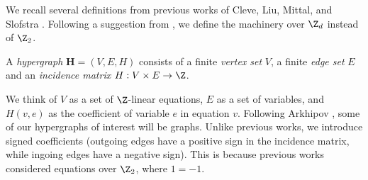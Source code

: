 We recall several definitions from previous works of Cleve, Liu, Mittal, and Slofstra \cite{slofstra2016tsirelson,cleve2016perfect,cleve2014characterization}. Following a suggestion from \cite{cleve2016perfect}, we define the machinery over $\Z_d$ instead of $\Z_2$. %


\begin{definition}
	A \emph{hypergraph} $\mathbf H = (V,E,H)$ consists of a finite \emph{vertex set} $V$, a finite \emph{edge set} $E$ and an \emph{incidence matrix} $H: V\times E \to \Z$. 
\end{definition}
We think of $V$ as a set of $\Z$-linear equations, $E$ as a set of variables, and $H(v,e)$ as the coefficient of variable $e$ in equation $v$. Following Arkhipov \cite{arkhipov2012extending}, some of our hypergraphs of interest will be graphs. Unlike previous works, we introduce signed coefficients (outgoing edges have a positive sign in the incidence matrix, while ingoing edges have a negative sign). This is because previous works considered equations over $\Z_2$, where $1 = -1$.


